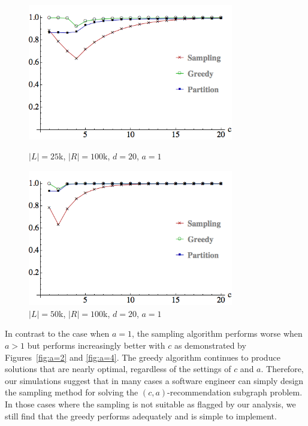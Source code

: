 \begin{figure}[t]
\centering
\begin{minipage}[h]{0.48\textwidth}
\centering
\includegraphics[width=0.8\textwidth]{images/l=25000,r=100000_Greedy_vs_Naive.png}
\caption{$|L|=25$k, $|R|=100$k, $d=20$, $a=1$}\label{fig:a=1:1}
\end{minipage}
\hspace{0cm}
\begin{minipage}[h]{0.48\textwidth}
\centering
\includegraphics[width=0.8\textwidth]{images/l=50000,r=100000_Greedy_vs_Naive.png}
\caption{$|L|=50$k, $|R|=100$k, $d=20$, $a=1$}\label{fig:a=1:2}
\end{minipage}
\vspace{-0.2in}
\end{figure}



In contrast to the case when $a=1$, the sampling algorithm performs
worse when $a>1$ but performs increasingly better with $c$ as
demonstrated by Figures~\ref{fig:a=2} and \ref{fig:a=4}. The greedy
algorithm continues to produce solutions that are nearly optimal,
regardless of the settings of $c$ and $a$. Therefore, our simulations
suggest that in many cases a software engineer can simply design the
sampling method for solving the $(c, a)$-recommendation subgraph
problem. In those cases where the sampling is not suitable as flagged by our analysis, we still
find that the greedy performs adequately and is simple to implement.

